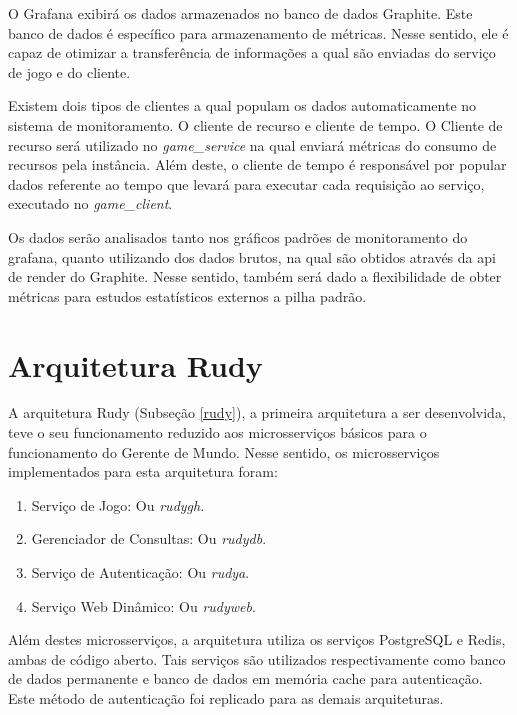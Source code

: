 O Grafana exibirá os dados armazenados no banco de dados Graphite.
%
Este banco de dados é específico para armazenamento de métricas.
%
Nesse sentido, ele é capaz de otimizar a transferência de informações a qual são enviadas do serviço de jogo e do cliente.

Existem dois tipos de clientes a qual populam os dados automaticamente no sistema de monitoramento.
%
O cliente de recurso e cliente de tempo. O Cliente de recurso será utilizado no \textit{game\_service} na qual enviará métricas do consumo de recursos pela instância.
%
Além deste, o cliente de tempo é responsável por popular dados referente ao tempo que levará para executar cada requisição ao serviço, executado no \textit{game\_client}.

Os dados serão analisados tanto nos gráficos padrões de monitoramento do grafana, quanto utilizando dos dados brutos, na qual são obtidos através da \ac{api} de render do Graphite.
%
Nesse sentido, também será dado a flexibilidade de obter métricas para estudos estatísticos externos a pilha padrão.

\section{Arquitetura Rudy}
\label{sec:arc_rudy}

A arquitetura Rudy (Subseção \ref{rudy}), a primeira arquitetura a ser desenvolvida, teve o seu funcionamento reduzido aos microsserviços básicos para o funcionamento do Gerente de Mundo.
%
Nesse sentido, os microsserviços implementados para esta arquitetura foram:

\begin{enumerate}
    \item Serviço de Jogo: Ou \textit{rudygh}.
    \item Gerenciador de Consultas: Ou \textit{rudydb}.
    \item Serviço de Autenticação: Ou \textit{rudya}.
    \item Serviço Web Dinâmico: Ou \textit{rudyweb}.
\end{enumerate}



Além destes microsserviços, a arquitetura utiliza os serviços PostgreSQL e Redis, ambas de código aberto.
%
Tais serviços são utilizados respectivamente como banco de dados permanente e banco de dados em memória cache para autenticação.
%
Este método de autenticação foi replicado para as demais arquiteturas.



